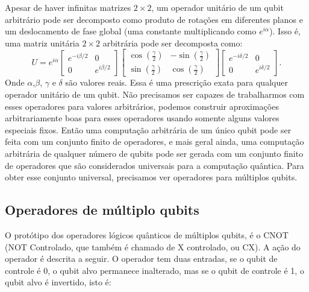 Apesar de haver infinitas matrizes $2\times 2$, um  operador unitário de um qubit arbitrário pode ser decomposto como produto de rotações em diferentes planos e um deslocamento de fase global (uma constante multiplicando como $e^{i\alpha}$).  Isso é, uma matriz unitária $2 \times 2$ arbitrária  pode ser decomposta como:
\begin{equation}
U=e^{i\alpha}\left[\begin{array}{cc}
e^{-i\beta/2} & 0\\
0 & e^{i\beta/2}
\end{array}\right]\left[\begin{array}{cc}
\cos\left(\frac{\gamma}{2}\right) & -\sin\left(\frac{\gamma}{2}\right)\\
\sin\left(\frac{\gamma}{2}\right) & \cos\left(\frac{\gamma}{2}\right)
\end{array}\right]\left[\begin{array}{cc}
e^{-i\delta/2} & 0\\
0 & e^{i\delta/2}
\end{array}\right]
. \end{equation}
Onde $\alpha$,$\beta$, $\gamma$ e $\delta$  são valores reais. Essa é uma prescrição exata para qualquer operador unitário de um qubit. Não precisamos ser capazes de trabalharmos com esses operadores para valores arbitrários, podemos construir aproximações arbitrariamente boas para esses operadores usando somente alguns valores especiais fixos. Então uma computação arbitrária de um único qubit pode ser feita com um conjunto finito de operadores, e mais geral ainda, uma computação arbitrária de qualquer número de qubits pode ser gerada com um conjunto finito de operadores que são considerados universais para a computação quântica. Para obter esse conjunto universal, precisamos ver operadores para múltiplos qubits.

\subsection{Operadores de múltiplo qubits}

O protótipo dos operadores lógicos quânticos de múltiplos qubits, é o CNOT (NOT Controlado,  que também é chamado de X controlado, ou CX). A ação do operador  é descrita a seguir. O operador tem duas entradas, se o qubit de controle é $0$, o qubit alvo permanece inalterado, mas se o qubit de controle é 1, o qubit alvo é invertido, isto é:

